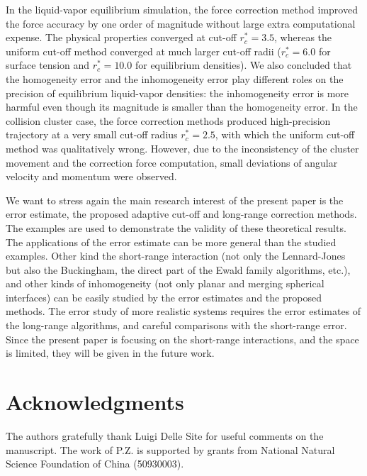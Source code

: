 \documentclass[aps, pre, preprint]{revtex4}
\begin{document}
In the liquid-vapor equilibrium simulation, the
force correction method improved the force accuracy by one order of
magnitude without large extra computational expense. The physical
properties converged at cut-off $r_c^\ast = 3.5$, whereas the uniform
cut-off method converged at much larger cut-off radii ($r_c^\ast = 6.0$
for surface tension and $r_c^\ast = 10.0$ for equilibrium
densities). {
We also concluded that the homogeneity
error and the inhomogeneity error play different roles on the precision
of equilibrium liquid-vapor densities: the inhomogeneity error
is more harmful even though its magnitude is smaller than the homogeneity
error.}
In the collision cluster case,
the force correction methods produced high-precision trajectory at a
very small cut-off radius $r_c^\ast=2.5$, with which the uniform
cut-off method was qualitatively wrong. However, due to the
inconsistency of the cluster movement and the correction force
computation, small deviations of angular velocity and momentum were
observed.

{
  We want to stress again the main research interest of the present paper is the
  error estimate, the proposed adaptive cut-off and long-range
  correction methods. The examples are used to demonstrate
  the validity of these theoretical results. The applications
  of the error estimate can be more general than the studied examples.
  Other kind the short-range interaction (not only the Lennard-Jones
  but also the Buckingham,
  the direct part of the Ewald family algorithms, etc.),
  and other kinds of inhomogeneity
  (not only  planar and merging spherical interfaces)
  can be easily studied by the error estimates and the proposed methods.
  The error study of
  more realistic systems requires the error estimates of the long-range
  algorithms, and careful comparisons with the short-range error.
  Since the present paper is focusing on the short-range
  interactions, and the space is limited,
  they will be given in the future work.
}


\section*{Acknowledgments}
The authors gratefully thank Luigi Delle Site for useful comments
on the manuscript. The work of P.Z. is supported by grants from
National Natural Science Foundation of China (50930003).



{}

\end{document}
